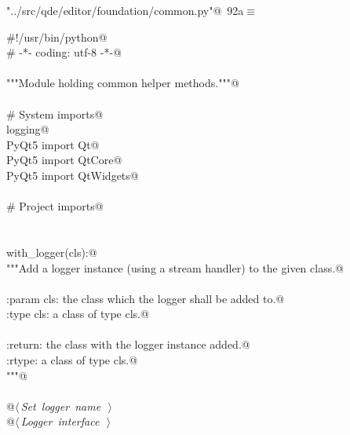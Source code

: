 \documentclass[
    a4paper,      %
    10pt,         %
    openright,    %
    notitlepage,  %
    parskip=half, %
]{scrreprt}       %
\theoremstyle{definition}                    %
\begin{document}
\begin{flushleft} \small
\begin{minipage}{\linewidth}\label{scrap146}\raggedright\small
{} \verb@"../src/qde/editor/foundation/common.py"@\nobreak\ {\footnotesize {92a}}$\equiv$
\vspace{-1ex}
\begin{list}{}{} \item
\mbox{}\lstinline@#!/usr/bin/python@\\
\mbox{}\lstinline@# -*- coding: utf-8 -*-@\\
\mbox{}\lstinline@@\\
\mbox{}\lstinline@"""Module holding common helper methods."""@\\
\mbox{}\lstinline@@\\
\mbox{}\lstinline@# System imports@\\
\mbox{}\lstinline@import logging@\\
\mbox{}\lstinline@from PyQt5 import Qt@\\
\mbox{}\lstinline@from PyQt5 import QtCore@\\
\mbox{}\lstinline@from PyQt5 import QtWidgets@\\
\mbox{}\lstinline@@\\
\mbox{}\lstinline@# Project imports@\\
\mbox{}\lstinline@@\\
\mbox{}\lstinline@@\\
\mbox{}\lstinline@def with_logger(cls):@\\
\mbox{}\lstinline@    """Add a logger instance (using a stream handler) to the given class.@\\
\mbox{}\lstinline@@\\
\mbox{}\lstinline@    :param cls: the class which the logger shall be added to.@\\
\mbox{}\lstinline@    :type  cls: a class of type cls.@\\
\mbox{}\lstinline@@\\
\mbox{}\lstinline@    :return: the class with the logger instance added.@\\
\mbox{}\lstinline@    :rtype:  a class of type cls.@\\
\mbox{}\lstinline@    """@\\
\mbox{}\lstinline@@\\
\mbox{}\lstinline@    @\hbox{$\langle\,${\itshape Set logger name}\nobreak\ {\footnotesize {}}$\,\rangle$}\lstinline@@\\
\mbox{}\lstinline@    @\hbox{$\langle\,${\itshape Logger interface}\nobreak\ {\footnotesize {}}$\,\rangle$}\lstinline@@\\
\mbox{}\lstinline@@{\NWsep}
\end{list}
\vspace{-1.5ex}
\footnotesize
\begin{list}{}{\setlength{\itemsep}{-\parsep}\setlength{\itemindent}{-\leftmargin}}

\item{}
\end{list}
\end{minipage}\vspace{4ex}
\end{flushleft}
\end{document}
